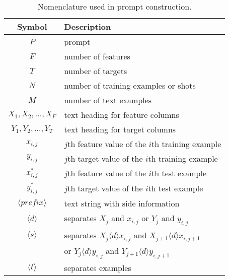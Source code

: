 \begin{table}[t]
\vspace{-2mm}
  \centering
  \caption{Nomenclature used in prompt construction.}
  \label{tab:nomenclature}%
  \begin{small}
  \begin{adjustbox}{max width=\columnwidth}
    \begin{tabular}{cl}
    \toprule
    \multicolumn{1}{c}{\textbf{Symbol}} & \multicolumn{1}{l}{\textbf{Description}} \\
    \midrule
     $P$ & prompt\\
     $F$ & number of features\\
     $T$ & number of targets\\
     $N$ & number of training examples or shots\\
     $M$ & number of text examples\\
     ${X_1, X_2, \dots, X_F}$ & text heading for feature columns\\
     ${Y_1, Y_2, \dots, Y_T}$ & text heading for target columns\\
     $x_{i,j}$ &  $j$th feature value of the $i$th training example\\
     $y_{i,j}$ &  $j$th target value of the $i$th training example\\
     $x^*_{i,j}$ &  $j$th feature value of the $i$th test example\\
     $y^*_{i,j}$ &  $j$th target value of the $i$th test example\\
     $\langle prefix \rangle$ & text string with side information\\
     $\langle d \rangle$ & separates $X_j$ and $x_{i,j}$ or $Y_j$ and $y_{i,j}$\\
     $\langle s \rangle$ & separates $X_j\langle d \rangle x_{i,j}$ and $X_{j+1}\langle d \rangle x_{i,j+1}$\\
      & or $Y_j\langle d \rangle y_{i,j}$ and $Y_{j+1}\langle d \rangle y_{i,j+1}$\\
     $\langle t \rangle$ & separates examples\\
    \bottomrule
    \end{tabular}%
  \end{adjustbox}
  \end{small}
\vspace{-3mm}
\end{table}%
 